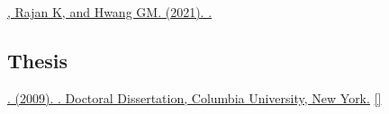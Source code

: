 \begin{description}
  \item \href{https://arxiv.org/abs/2105.07284}
    {, Rajan K, and Hwang GM. (2021). .
    }
\end{description}

\subsection*{Thesis}
\label{sec:thesis}

\begin{description}
  \item \href{https://jdmonaco.com/files/monaco-phdthesis-2009.pdf}
    {. (2009). . Doctoral Dissertation, Columbia University, New York.}
  \href{https://search.proquest.com/docview/304862872/abstract}
  {}
  \href{https://jdmonaco.com/files/monaco-phdthesis-2009.pdf}{[]}
\end{description}

